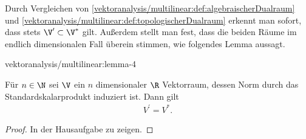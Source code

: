 \documentclass[letterpaper,10pt,english]{jupyterBook}
\begin{document}
\par
Durch Vergleichen von \cref{vektoranalysis/multilinear:def:algebraischerDualraum} und \cref{vektoranalysis/multilinear:def:topologischerDualraum} erkennt man sofort, dass stets \(\V^\prime\subset \V^\ast\) gilt.
Außerdem stellt man fest, dass die beiden Räume im endlich dimensionalen Fall überein stimmen, wie folgendes Lemma aussagt.
\begin{lemma}{}{vektoranalysis/multilinear:lemma-4}



\par
Für \(n\in\N\) sei \(\V\) ein \(n\) dimensionaler \(\R\) Vektorraum, dessen Norm durch das Standardskalarprodukt induziert ist.
Dann gilt
\begin{align*}
V^\prime = V^\ast.
\end{align*}\end{lemma}

\begin{proof}
 In der Hausaufgabe zu zeigen.
\end{proof}
\end{document}
